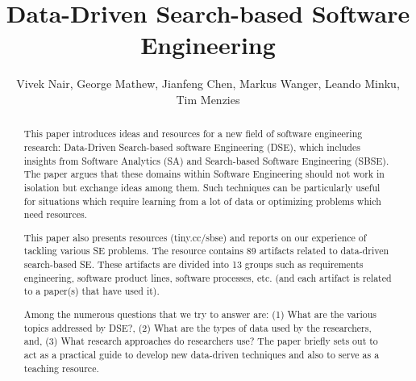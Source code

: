 \documentclass[table, xcdraw, sigconf,review, anonymous]{acmart}
\begin{document}
\title{Data-Driven Search-based Software Engineering}

\author{Vivek Nair, George Mathew, Jianfeng Chen, Markus Wanger, Leando Minku, Tim Menzies}
\email{}


\begin{abstract}
This paper introduces ideas and resources for a new field of software engineering research: Data-Driven Search-based software Engineering (DSE), which includes insights from Software Analytics (SA) and Search-based Software Engineering (SBSE). The paper argues that these domains within Software Engineering should not work in isolation but exchange ideas among them. Such techniques can be particularly useful for situations which require learning from a lot of data or optimizing problems which need resources. 

This paper also presents resources (tiny.cc/sbse) and reports on our experience of tackling various SE problems.  The resource contains 89 artifacts related to data-driven search-based SE. These artifacts are divided into 13 groups such as requirements engineering, software product lines, software processes, etc. (and each artifact is related to a paper(s) that have used it).

Among the numerous questions that we try to answer are: (1) What are the various topics addressed by DSE?, (2) What are the types of data used by the researchers, and, (3) What research approaches do researchers use? The paper briefly sets out to act as a practical guide to develop new data-driven techniques and also to serve as a teaching resource.
\end{abstract}

%
%
\end{document}
